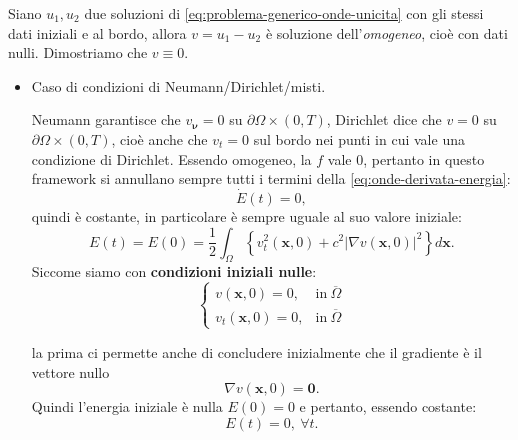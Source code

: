 \documentclass[10pt,a4paper,twoside,openright]{book}
\newcommand{\x}{\mathbf{x}}
\newcommand{\zer}{\mathbf{0}}
\begin{document}
\begin{dimostrazione}
	Siano $u_{1} ,u_{2}$ due soluzioni di \eqref{eq:problema-generico-onde-unicita} con gli stessi dati iniziali e al bordo, allora $v=u_{1} -u_{2}$ è soluzione dell'\textit{omogeneo}, cioè con dati nulli. Dimostriamo che $v\equiv 0$.
	\begin{itemize}
		\item Caso di condizioni di Neumann/Dirichlet/misti.
		      
		      Neumann garantisce che $v_{\bm{\nu }} =0$ su $\partial \Omega \times ( 0,T)$, Dirichlet dice che $v=0$ su $\partial \Omega \times ( 0,T)$, cioè anche che $v_{t} =0$ sul bordo nei punti in cui vale una condizione di Dirichlet. Essendo omogeneo, la $f$ vale $0$, pertanto in questo framework si annullano sempre tutti i termini della \eqref{eq:onde-derivata-energia}:
		      \begin{equation*}
		      	\dot{E}( t) =0,
		      \end{equation*}quindi è costante, in particolare è sempre uguale al suo valore iniziale:
		      \begin{equation*}
		      	E( t) =E( 0) =\frac{1}{2}\int _{\Omega }\left\{v_{t}^{2}(\x ,0) +c^{2}| \nabla v(\x ,0)| ^{2}\right\} d\x .
		      \end{equation*}Siccome siamo con \textbf{condizioni iniziali nulle}:
		      \begin{equation*}
		      	\begin{cases}
		      		v(\x ,0) =0,     & \text{in} \ \overline{\Omega } \\
		      		v_{t}(\x ,0) =0, & \text{in} \ \overline{\Omega } 
		      	\end{cases}
		      \end{equation*}
		      
		      la prima ci permette anche di concludere inizialmente che il gradiente è il vettore nullo\begin{equation*}
		      \nabla v(\x ,0) =\zer .
		\end{equation*}Quindi l'energia iniziale è nulla $E( 0) =0$ e pertanto, essendo costante:
		\begin{equation*}
			E( t) =0,\ \forall t.
		\end{equation*}
		

\end{itemize}
\end{dimostrazione}
\end{document}
